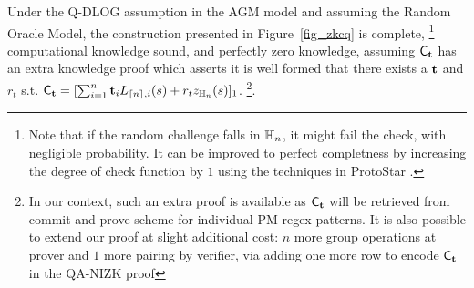 \begin{theorem} \label{thm_main}
Under the Q-DLOG assumption in the AGM model and assuming
the Random Oracle Model, the construction presented in Figure\ \ref{fig_zkcq}
is complete, \footnote{Note that if the random challenge falls in
${\mathbb{H}_{n}}$, it might fail the check, with negligible probability.
It can be improved to perfect completness by increasing the degree
of check function by $1$ using the techniques in ProtoStar \cite{ProtoStar}.} computational knowledge sound, and 
perfectly zero knowledge, assuming ${\mathsf{C}}_{{{\mathbf {t}}}}$ has an
extra knowledge proof which asserts it is well formed
that there exists a ${{\mathbf {t}}}$ and $r_t$ s.t.
${\mathsf{C}}_{{{\mathbf {t}}}} = [\sum_{i=1}^n {{\mathbf {t}}}_i L_{{\lceil{n}\rceil},i}(s) + r_t z_{\mathbb{H}_{n}}(s)]_1$.
\footnote{In our context, such an extra proof is available as
${\mathsf{C}}_{{{\mathbf {t}}}}$ will be retrieved from commit-and-prove
scheme for individual PM-regex patterns. It is also possible
to extend our proof at slight additional cost: $n$ more group
operations at prover and $1$ more pairing by verifier, via
adding one more row to encode ${\mathsf{C}}_{{{\mathbf {t}}}}$ in the QA-NIZK proof}.
\end{theorem}


